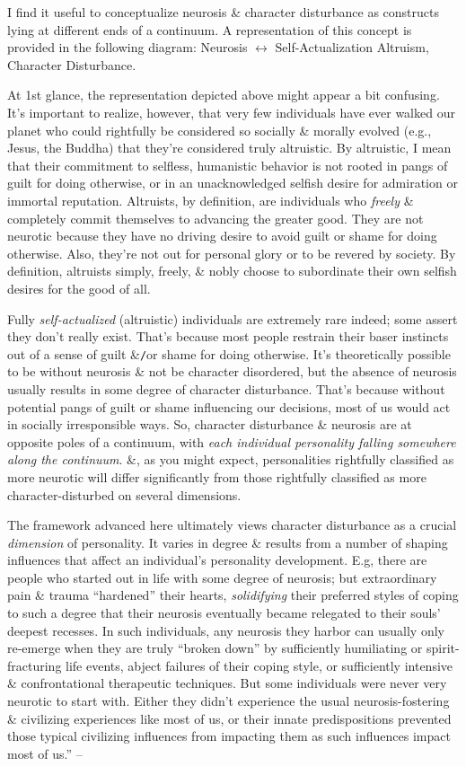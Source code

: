 \documentclass{article}
\numberwithin{equation}{section}
\begin{document}
I find it useful to conceptualize neurosis \& character disturbance as constructs lying at different ends of a continuum. A representation of this concept is provided in the following diagram: Neurosis $\longleftrightarrow$ Self-Actualization Altruism, Character Disturbance.

At 1st glance, the representation depicted above might appear a bit confusing. It's important to realize, however, that very few individuals have ever walked our planet who could rightfully be considered so socially \& morally evolved (e.g., Jesus, the Buddha) that they're considered truly altruistic. By altruistic, I mean that their commitment to selfless, humanistic behavior is not rooted in pangs of guilt for doing otherwise, or in an unacknowledged selfish desire for admiration or immortal reputation. Altruists, by definition, are individuals who \textit{freely} \& completely commit themselves to advancing the greater good. They are not neurotic because they have no driving desire to avoid guilt or shame for doing otherwise. Also, they're not out for personal glory or to be revered by society. By definition, altruists simply, freely, \& nobly choose to subordinate their own selfish desires for the good of all.

Fully \textit{self-actualized} (altruistic) individuals are extremely rare indeed; some assert they don't really exist. That's because most people restrain their baser instincts out of a sense of guilt \&\texttt{/}or shame for doing otherwise. It's theoretically possible to be without neurosis \& not be character disordered, but the absence of neurosis usually results in some degree of character disturbance. That's because without potential pangs of guilt or shame influencing our decisions, most of us would act in socially irresponsible ways. So, character disturbance \& neurosis are at opposite poles of a continuum, with \textit{each individual personality falling somewhere along the continuum}. \&, as you might expect, personalities rightfully classified as more neurotic will differ significantly from those rightfully classified as more character-disturbed on several dimensions.

The framework advanced here ultimately views character disturbance as a crucial \textit{dimension} of personality. It varies in degree \& results from a number of shaping influences that affect an individual's personality development. E.g, there are people who started out in life with some degree of neurosis; but extraordinary pain \& trauma ``hardened'' their hearts, \textit{solidifying} their preferred styles of coping to such a degree that their neurosis eventually became relegated to their souls' deepest recesses. In such individuals, any neurosis they harbor can usually only re-emerge when they are truly ``broken down'' by sufficiently humiliating or spirit-fracturing life events, abject failures of their coping style, or sufficiently intensive \& confrontational therapeutic techniques. But some individuals were never very neurotic to start with. Either they didn't experience the usual neurosis-fostering \& civilizing experiences like most of us, or their innate predispositions prevented those typical civilizing influences from impacting them as such influences impact most of us.'' -- \cite[pp. 24--27]{Simon2011}
\end{document}
